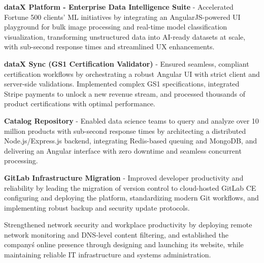 \begin{sectionContainer}
	\vspace{0.4em}\noindent\normalsize\textbf{dataX Platform - Enterprise Data Intelligence Suite} - Accelerated Fortune 500 clients' ML initiatives by integrating an AngularJS-powered UI playground for bulk image processing and real-time model classification visualization, transforming unstructured data into AI-ready datasets at scale, with sub-second response times and streamlined UX enhancements.
\end{sectionContainer}

\begin{sectionContainer}
	\vspace{0.4em}\noindent\normalsize\textbf{dataX Sync (GS1 Certification Validator)} - Ensured seamless, compliant certification workflows by orchestrating a robust Angular UI with strict client and server-side validations. Implemented complex GS1 specifications, integrated Stripe payments to unlock a new revenue stream, and processed thousands of product certifications with optimal performance.
\end{sectionContainer}

\begin{sectionContainer}
	\vspace{0.4em}\noindent\normalsize\textbf{Catalog Repository} - Enabled data science teams to query and analyze over 10 million products with sub-second response times by architecting a distributed Node.js/Express.js backend, integrating Redis-based queuing and MongoDB, and delivering an Angular interface with zero downtime and seamless concurrent processing.
\end{sectionContainer}

\begin{sectionContainer}
	\vspace{0.4em}\noindent\normalsize\textbf{GitLab Infrastructure Migration} - Improved developer productivity and reliability by leading the migration of version control to cloud-hosted GitLab CE configuring and deploying the platform, standardizing modern Git workflows, and implementing robust backup and security update protocols.
\end{sectionContainer}


\begin{sectionContainer}
	\vspace{0.4em}\noindent\normalsize Strengthened network security and workplace productivity by deploying remote network monitoring and DNS-level content filtering, and established the company\'s online presence through designing and launching its website, while maintaining reliable IT infrastructure and systems administration.
\end{sectionContainer}
\nopagebreak[4]